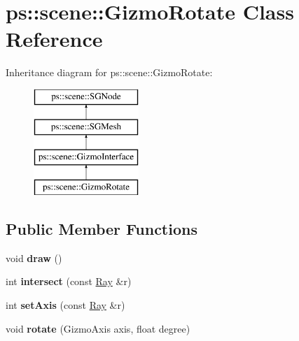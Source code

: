 \hypertarget{classps_1_1scene_1_1GizmoRotate}{}\section{ps\+:\+:scene\+:\+:Gizmo\+Rotate Class Reference}
\label{classps_1_1scene_1_1GizmoRotate}
Inheritance diagram for ps\+:\+:scene\+:\+:Gizmo\+Rotate\+:\begin{figure}[H]
\begin{center}
\leavevmode
\includegraphics[height=4.000000cm]{classps_1_1scene_1_1GizmoRotate}
\end{center}
\end{figure}
\subsection*{Public Member Functions}
\begin{DoxyCompactItemize}
\item 
\hypertarget{classps_1_1scene_1_1GizmoRotate_a4b5b365a5783c65bf2e2e9ef88c56cfc}{}void {\bfseries draw} ()\label{classps_1_1scene_1_1GizmoRotate_a4b5b365a5783c65bf2e2e9ef88c56cfc}

\item 
\hypertarget{classps_1_1scene_1_1GizmoRotate_aef3baee21c5d540657938c71b6aa42e7}{}int {\bfseries intersect} (const \hyperlink{classps_1_1base_1_1Ray}{Ray} \&r)\label{classps_1_1scene_1_1GizmoRotate_aef3baee21c5d540657938c71b6aa42e7}

\item 
\hypertarget{classps_1_1scene_1_1GizmoRotate_a4fd70a55173d8d4746ffd4968cf4f79c}{}int {\bfseries set\+Axis} (const \hyperlink{classps_1_1base_1_1Ray}{Ray} \&r)\label{classps_1_1scene_1_1GizmoRotate_a4fd70a55173d8d4746ffd4968cf4f79c}

\item 
\hypertarget{classps_1_1scene_1_1GizmoRotate_aeeca97ecfe9fb39c224891e08c940769}{}void {\bfseries rotate} (Gizmo\+Axis axis, float degree)\label{classps_1_1scene_1_1GizmoRotate_aeeca97ecfe9fb39c224891e08c940769}

\end{DoxyCompactItemize}
